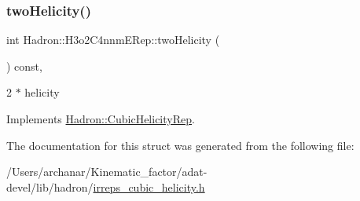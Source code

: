 \mbox{\label{structHadron_1_1H3o2C4nnmERep_a35fd1930d21f1fdc0c007b9d9f95b211}} 
\subsubsection{\texorpdfstring{twoHelicity()}{twoHelicity()}\hspace{0.1cm}{\footnotesize\ttfamily [3/3]}}
{\footnotesize\ttfamily int Hadron\+::\+H3o2\+C4nnm\+E\+Rep\+::two\+Helicity (\begin{DoxyParamCaption}{ }\end{DoxyParamCaption}) const\hspace{0.3cm}{\ttfamily [inline]}, {\ttfamily [virtual]}}

2 $\ast$ helicity 

Implements \mbox{\hyperlink{structHadron_1_1CubicHelicityRep_af507aa56fc2747eacc8cb6c96db31ecc}{Hadron\+::\+Cubic\+Helicity\+Rep}}.



The documentation for this struct was generated from the following file\+:\begin{DoxyCompactItemize}
\item 
/\+Users/archanar/\+Kinematic\+\_\+factor/adat-\/devel/lib/hadron/\mbox{\hyperlink{adat-devel_2lib_2hadron_2irreps__cubic__helicity_8h}{irreps\+\_\+cubic\+\_\+helicity.\+h}}\end{DoxyCompactItemize}
